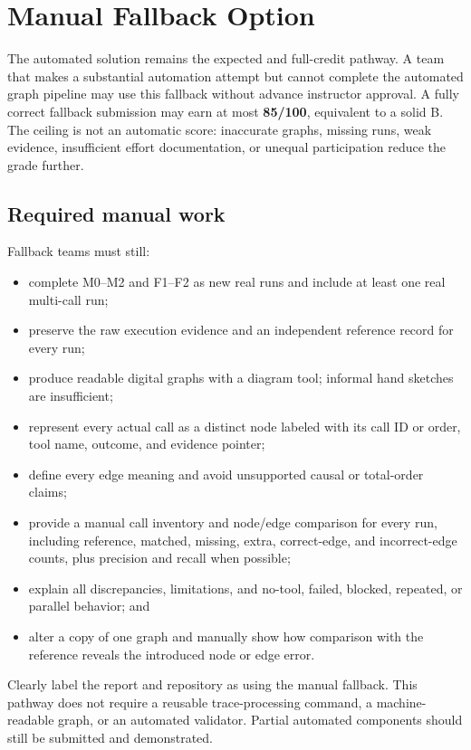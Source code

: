 \documentclass[11pt]{article}
\begin{document}
\section{Manual Fallback Option}\label{sec:manual-fallback}
The automated solution remains the expected and full-credit pathway. A team that makes a substantial automation attempt but cannot complete the automated graph pipeline may use this fallback without advance instructor approval. A fully correct fallback submission may earn at most \textbf{85/100}, equivalent to a solid B. The ceiling is not an automatic score: inaccurate graphs, missing runs, weak evidence, insufficient effort documentation, or unequal participation reduce the grade further.

\subsection{Required manual work}
Fallback teams must still:
\begin{itemize}
  \item complete M0--M2 and F1--F2 as new real runs and include at least one real multi-call run;
  \item preserve the raw execution evidence and an independent reference record for every run;
  \item produce readable digital graphs with a diagram tool; informal hand sketches are insufficient;
  \item represent every actual call as a distinct node labeled with its call ID or order, tool name, outcome, and evidence pointer;
  \item define every edge meaning and avoid unsupported causal or total-order claims;
  \item provide a manual call inventory and node/edge comparison for every run, including reference, matched, missing, extra, correct-edge, and incorrect-edge counts, plus precision and recall when possible;
  \item explain all discrepancies, limitations, and no-tool, failed, blocked, repeated, or parallel behavior; and
  \item alter a copy of one graph and manually show how comparison with the reference reveals the introduced node or edge error.
\end{itemize}
Clearly label the report and repository as using the manual fallback. This pathway does not require a reusable trace-processing command, a machine-readable graph, or an automated validator. Partial automated components should still be submitted and demonstrated.
\end{document}
